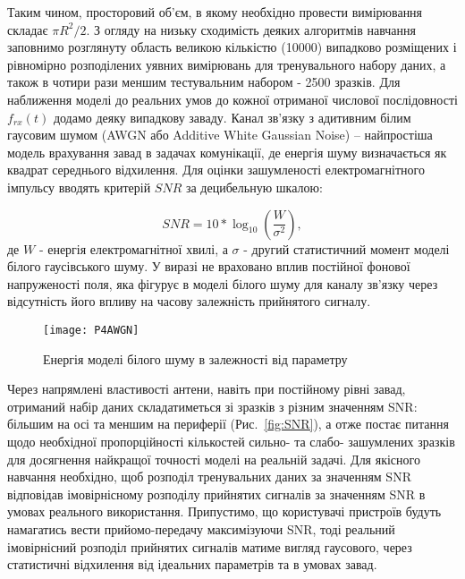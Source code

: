 Таким чином, просторовий об'єм, в якому необхідно провести вимірювання 
складає $ \pi R^2 / 2 $. З огляду на низьку сходимість деяких алгоритмів 
навчання заповнимо розглянуту область великою кількістю (10000) випадково 
розміщених і рівномірно розподілених уявних вимірювань для тренувального 
набору даних, а також в чотири рази меншим тестувальним набором - 
2500 зразків. Для наближення моделі до реальних умов до кожної
отриманої числової послідовності $ f_{rx} (t) $ додамо деяку випадкову 
заваду. Канал зв'язку з адитивним білим гаусовим шумом (AWGN або Additive 
White Gaussian Noise) -- найпростіша модель врахування завад в задачах 
комунікації, де енергія шуму визначається як квадрат середнього відхилення. 
Для оцінки зашумленості електромагнітного імпульсу вводять критерій $ SNR $ 
за децибельную шкалою:

\begin{equation} \label{eq:snr}
SNR = 10 * \log_{10} \left( \frac{W}{\sigma^2} \right),
\end{equation}
%
де $ W $ - енергія електромагнітної хвилі, а $ \sigma $ - другий статистичний 
момент моделі білого гаусівського шуму. У виразі не враховано вплив постійної 
фонової напруженості поля, яка фігурує в моделі білого шуму для каналу зв'язку 
через відсутність його впливу на часову залежність прийнятого сигналу.

\begin{figure}[htbp] \begin{center}
\texttt{[image: P4AWGN]}
\caption{Енергія моделі білого шуму в залежності від параметру} \label{fig:P4AWGN}
\end{center} \end{figure}

Через напрямлені властивості антени, навіть при постійному рівні завад, 
отриманий набір даних складатиметься зі зразків з різним значенням SNR: 
більшим на осі та меншим на периферії (Рис.~\ref{fig:SNR}), а отже постає 
питання щодо необхідної пропорційності кількостей сильно- та слабо- 
зашумлених зразків для досягнення найкращої точності моделі на реальній 
задачі. Для якісного навчання необхідно, щоб розподіл тренувальних даних за 
значенням SNR відповідав імовірнісному розподілу прийнятих сигналів за 
значенням SNR в умовах реального використання. Припустимо, що користувачі 
пристроїв будуть намагатись вести прийомо-передачу максимізуючи SNR, тоді 
реальний імовірнісний розподіл прийнятих сигналів матиме вигляд 
гаусового, через статистичні відхилення від ідеальних параметрів та в 
умовах завад.

